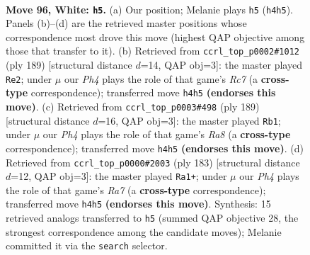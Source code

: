 \documentclass[11pt]{article}
\begin{document}
\clearpage

\begin{figure}[p]\centering
\begin{subfigure}{0.46\textwidth}\centering
\resizebox{\linewidth}{!}{%
\newchessgame
\chessboard[
  setfen={7k/B7/4r3/1R6/4p2P/5p2/3K1P2/8 w - - 1 96},
  showmover=false,
  pgfstyle=straightmove, color=movearrow, markmove={h4-h5}
]}
\caption{}
\end{subfigure}\hfill
\begin{subfigure}{0.46\textwidth}\centering
\resizebox{\linewidth}{!}{%
\newchessgame
\chessboard[
  setfen={8/6k1/3K4/6Pp/5R1P/8/2r5/8 b - - 16 95},
  showmover=false,
  pgfstyle=straightmove, color=movearrow, markmove={c2-e2}
]}
\caption{}
\end{subfigure}
\\[4pt]
\begin{subfigure}{0.46\textwidth}\centering
\resizebox{\linewidth}{!}{%
\newchessgame
\chessboard[
  setfen={8/8/6k1/6p1/6P1/5R1P/7K/r7 b - - 29 95},
  showmover=false,
  pgfstyle=straightmove, color=movearrow, markmove={a1-b1}
]}
\caption{}
\end{subfigure}\hfill
\begin{subfigure}{0.46\textwidth}\centering
\resizebox{\linewidth}{!}{%
\newchessgame
\chessboard[
  setfen={8/8/5k2/5p2/5P2/2R1P3/r7/3K4 b - - 62 92},
  showmover=false,
  pgfstyle=straightmove, color=movearrow, markmove={a2-a1}
]}
\caption{}
\end{subfigure}
\caption{\textbf{Move 96, White: \texttt{h5}.} (a) Our position; Melanie plays \texttt{h5} (\texttt{h4h5}). Panels (b)--(d) are the retrieved master positions whose correspondence most drove this move (highest QAP objective among those that transfer to it). (b) Retrieved from \texttt{ccrl\_top\_p0002\#1012} (ply 189) [structural distance $d$=14, QAP obj=3]: the master played \texttt{Re2}; under $\mu$ our \emph{Ph4} plays the role of that game's \emph{Rc7} (a \textbf{cross-type} correspondence); transferred move \texttt{h4h5} \textbf{(endorses this move)}. (c) Retrieved from \texttt{ccrl\_top\_p0003\#498} (ply 189) [structural distance $d$=16, QAP obj=3]: the master played \texttt{Rb1}; under $\mu$ our \emph{Ph4} plays the role of that game's \emph{Ra8} (a \textbf{cross-type} correspondence); transferred move \texttt{h4h5} \textbf{(endorses this move)}. (d) Retrieved from \texttt{ccrl\_top\_p0000\#2003} (ply 183) [structural distance $d$=12, QAP obj=3]: the master played \texttt{Ra1+}; under $\mu$ our \emph{Ph4} plays the role of that game's \emph{Ra7} (a \textbf{cross-type} correspondence); transferred move \texttt{h4h5} \textbf{(endorses this move)}. Synthesis: 15 retrieved analogs transferred to \texttt{h5} (summed QAP objective 28, the strongest correspondence among the candidate moves); Melanie committed it via the \texttt{search} selector.}
\label{fig:thought-m190}
\end{figure}
\end{document}
